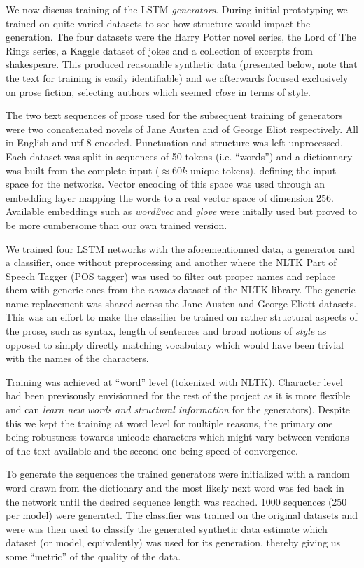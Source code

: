 We now discuss training of the LSTM \textit{generators}. During initial
prototyping we trained on quite varied datasets to see how structure would
impact the generation. The four datasets were the Harry Potter novel series,
the Lord of The Rings series, a Kaggle dataset of jokes and a collection of
excerpts from shakespeare. This produced reasonable synthetic data (presented
below, note that the text for training is easily identifiable) and we
afterwards focused exclusively on prose fiction, selecting authors which seemed
\textit{close} in terms of style.  

The two text sequences of prose used for the subsequent training of generators
were two concatenated novels of Jane Austen and of George Eliot respectively.
All in English and utf-8 encoded.  Punctuation and structure was left
unprocessed.  Each dataset was split in sequences of 50 tokens (i.e.
``words'') and a dictionnary was built from the complete input ($\approx 60k$
unique tokens), defining the input space for the networks.  Vector encoding of
this space was used through an embedding layer mapping the words to a real
vector space of dimension 256.  Available embeddings such as \textit{word2vec}
and \textit{glove} were initally used but proved to be more cumbersome than our
own trained version. 

We trained four LSTM networks with the aforementionned data, a generator and a
classifier, once without preprocessing and another where the NLTK Part of
Speech Tagger (POS tagger) was used to filter out proper names and replace them
with generic ones from the \textit{names} dataset of the NLTK library. The
generic name replacement was shared across the Jane Austen and George Eliott
datasets. This was an effort to make the classifier be trained on rather
structural aspects of the prose, such as syntax, length of sentences and broad
notions of \textit{style} as opposed to simply directly matching vocabulary
which would have been trivial with the names of the characters.

Training was achieved at ``word'' level (tokenized with NLTK).
Character level had been previsously envisionned for the rest of the project as
it is more flexible and can \textit{learn new words and structural
information}\cite{gravesGenerating} for the generators). Despite this we kept
the training at word level for multiple reasons, the primary one being
robustness towards unicode characters which might vary between versions of the
text available and the second one being speed of convergence. 

To generate the sequences the trained generators were initialized with a random
word drawn from the dictionary and the most likely next word was fed back in
the network until the desired sequence length was reached. 1000 sequences (250
per model) were generated.  The classifier was trained on the original datasets
and were was then used to classify the generated synthetic data estimate which
dataset (or model, equivalently) was used for its generation, thereby giving us
some ``metric'' of the quality of the data.

